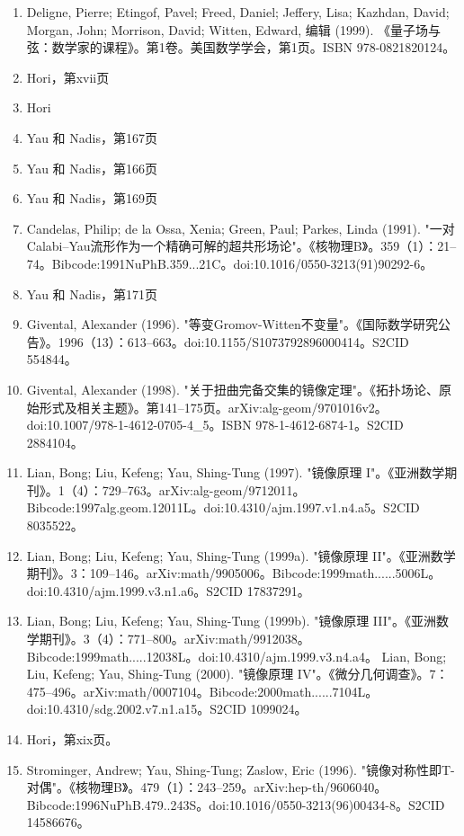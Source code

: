 \begin{enumerate}
\item Deligne, Pierre; Etingof, Pavel; Freed, Daniel; Jeffery, Lisa; Kazhdan, David; Morgan, John; Morrison, David; Witten, Edward, 编辑 (1999). 《量子场与弦：数学家的课程》。第1卷。美国数学学会，第1页。ISBN 978-0821820124。  
\item Hori，第xvii页  
\item Hori  
\item Yau 和 Nadis，第167页  
\item Yau 和 Nadis，第166页  
\item Yau 和 Nadis，第169页  
\item Candelas, Philip; de la Ossa, Xenia; Green, Paul; Parkes, Linda (1991). "一对Calabi–Yau流形作为一个精确可解的超共形场论"。《核物理B》。359（1）：21–74。Bibcode:1991NuPhB.359...21C。doi:10.1016/0550-3213(91)90292-6。  
\item Yau 和 Nadis，第171页  
\item Givental, Alexander (1996). "等变Gromov-Witten不变量"。《国际数学研究公告》。1996（13）：613–663。doi:10.1155/S1073792896000414。S2CID 554844。
\item Givental, Alexander (1998). "关于扭曲完备交集的镜像定理"。《拓扑场论、原始形式及相关主题》。第141–175页。arXiv:alg-geom/9701016v2。doi:10.1007/978-1-4612-0705-4_5。ISBN 978-1-4612-6874-1。S2CID 2884104。  
\item Lian, Bong; Liu, Kefeng; Yau, Shing-Tung (1997). "镜像原理 I"。《亚洲数学期刊》。1（4）：729–763。arXiv:alg-geom/9712011。Bibcode:1997alg.geom.12011L。doi:10.4310/ajm.1997.v1.n4.a5。S2CID 8035522。  
\item Lian, Bong; Liu, Kefeng; Yau, Shing-Tung (1999a). "镜像原理 II"。《亚洲数学期刊》。3：109–146。arXiv:math/9905006。Bibcode:1999math......5006L。doi:10.4310/ajm.1999.v3.n1.a6。S2CID 17837291。  
\item Lian, Bong; Liu, Kefeng; Yau, Shing-Tung (1999b). "镜像原理 III"。《亚洲数学期刊》。3（4）：771–800。arXiv:math/9912038。Bibcode:1999math.....12038L。doi:10.4310/ajm.1999.v3.n4.a4。  
Lian, Bong; Liu, Kefeng; Yau, Shing-Tung (2000). "镜像原理 IV"。《微分几何调查》。7：475–496。arXiv:math/0007104。Bibcode:2000math......7104L。doi:10.4310/sdg.2002.v7.n1.a15。S2CID 1099024。  
\item Hori，第xix页。
\item Strominger, Andrew; Yau, Shing-Tung; Zaslow, Eric (1996). "镜像对称性即T-对偶"。《核物理B》。479（1）：243–259。arXiv:hep-th/9606040。Bibcode:1996NuPhB.479..243S。doi:10.1016/0550-3213(96)00434-8。S2CID 14586676。  

\end{enumerate}
